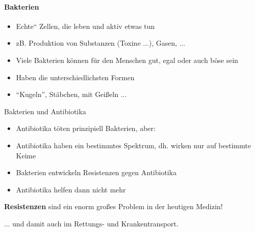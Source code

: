 \documentclass{article}
\begin{document}
\paragraph[Bakterien]{Bakterien}
\begin{itemize}
\item {\mdseries
{\quotedblbase}Echte{\textquotedblleft} Zellen, die leben und aktiv
etwas tun}

\end{itemize}
\begin{itemize}
\item {\mdseries
zB. Produktion von Substanzen (Toxine ...), Gasen, ...}

\end{itemize}
\begin{itemize}
\item {\mdseries
Viele Bakterien k\"onnen f\"ur den Menschen gut, egal oder auch b\"ose
sein}

\item {\mdseries
Haben die unterschiedlichsten Formen}

\end{itemize}
\begin{itemize}
\item {\mdseries
{\textquotedblleft}Kugeln{\textquotedblright}, St\"abchen, mit
Gei{\ss}eln ... }

\end{itemize}
{\mdseries\color{black}
Bakterien und Antibiotika}

\begin{itemize}
\item {\mdseries
Antibiotika t\"oten prinzipiell Bakterien, aber:}

\end{itemize}
\begin{itemize}
\item {\mdseries
Antibiotika haben ein bestimmtes Spektrum, dh. wirken nur auf bestimmte
Keime}

\item {\mdseries
Bakterien entwickeln Resistenzen gegen Antibiotika}

\item {\mdseries
Antibiotika helfen dann nicht mehr}

\end{itemize}
{\mdseries
\textbf{Resistenzen} sind ein enorm gro{\ss}es Problem in der heutigen
Medizin!}

{\mdseries
... und damit auch im Rettungs- und Krankentransport.}
\end{document}
